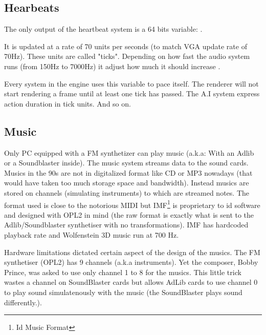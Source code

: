 \subsection{Hearbeats}

The only output of the heartbeat system is a 64 bits variable: .\\
\par
\begin{minipage}{\textwidth}

\end{minipage}
\par
It is updated at a rate of 70 units per seconds (to match VGA update rate of 70Hz). These units are called "ticks". Depending on how fast the audio system runs (from 150Hz to 7000Hz) it adjust how much it should increase .\\
\par
Every system in the engine uses this variable to pace itself. The renderer will not start rendering a frame until at least one tick has passed. The A.I system express action duration in tick units. And so on.\\


\subsection{Music}
Only PC equipped with a FM synthetizer can play music (a.k.a: With an Adlib or a Soundblaster inside). The music system streams data to the sound cards.  Musics in the 90s are not in digitalized format like CD or MP3 nowadays (that would have taken too much storage space and bandwidth). Instead musics are stored on channels (simulating instruments) to which are streamed notes. The format used is close to the notorious MIDI but IMF\footnote{Id Music Format} is proprietary to id software and designed with OPL2 in mind (the raw format is exactly what is sent to the Adlib/Soundblaster synthetiser with no transformations). IMF has hardcoded playback rate and Wolfenstein 3D music run at 700 Hz.\\
\par
Hardware limitations dictated certain aspect of the design of the musics. The FM synthetiser (OPL2) has 9 channels (a.k.a instruments). Yet the composer, Bobby Prince, was asked to use only channel 1 to 8 for the musics. This little trick wastes a channel on SoundBlaster cards but allows AdLib cards to use channel 0 to play sound simulatenously with the music (the SoundBlaster plays sound differently.).\\









